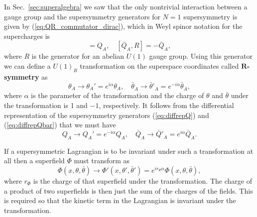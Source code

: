 \documentclass[notes.tex]{subfiles}
\begin{document}
In Sec.~\ref{sec:superalgebra} we  saw that the only nontrivial interaction between a gauge group and the supersymmetry generators for $N=1$ supersymmetry is given by  (\ref{eq:QR_commutator_dirac}), which in Weyl spinor notation for the supercharges is
\begin{equation}
[Q_A, R] = Q_A, \quad  [\bar Q_{\dot A}, R ] = -\bar Q_{\dot A},
\end{equation}
where $R$ is the generator for an abelian $U(1)$ gauge group.
Using this generator we can define a $U(1)_R$ transformation on the superspace coordinates called {\bf $\mathbf R$-symmetry} as
\begin{equation}
\theta_A \to \theta_A' = e^{i\alpha} \theta_A, \quad \bar\theta_{\dot A} \to  \bar\theta'_{\dot A}= e^{-i\alpha} \bar\theta_{\dot A},
\end{equation}
where $\alpha$ is the parameter of the transformation and the charge of $\theta$ and $\bar\theta$ under the transformation is 1 and $-1$, respectively. It follows from the differential representation of the supersymmetry generators (\ref{eq:diffrepQ}) and (\ref{eq:diffrepQbar}) that we must have
\begin{equation}
Q_A \to Q_A' = e^{-i\alpha} Q_A, \quad \bar Q_{\dot A} \to  \bar Q'_{\dot A}= e^{i\alpha} \bar Q_{\dot A}.
\end{equation}


If a supersymmetric Lagrangian is to be invariant under such a transformation at all then a superfield $\Phi$ must transform as
\begin{equation}
\Phi(x,\theta,\bar\theta)\to \Phi'(x,\theta',\bar\theta')= e^{ir_\Phi\alpha}\Phi(x,\theta, \bar\theta),
\end{equation}
where $r_\Phi$ is the charge of that superfield under the transformation. The charge of a product of two superfields is then just the sum of the charges of the fields. This is required so that the kinetic term in the Lagrangian is invariant under the transformation.
\end{document}
